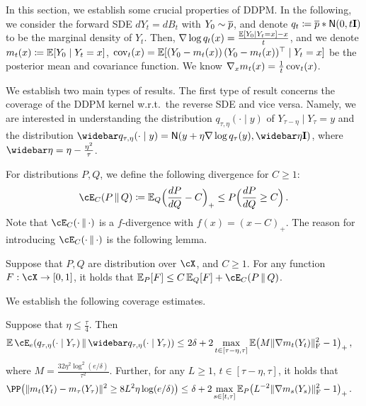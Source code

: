 In this section, we establish some crucial properties of DDPM\@.
In the following, we consider the forward SDE $dY_t=dB_t$ with $Y_0\sim \overline{p}$, and denote $q_t\deq \pbar*\normal{0,t\Id}$ to be the marginal density of $Y_t$. Then, $\nabla \log q_t(x)=\frac{\operatorname{\mathbb{E}}[Y_0\mid Y_t=x]-x}{t}$, and we denote $m_t(x)\coloneqq \operatorname{\mathbb{E}}[Y_0\mid Y_t=x]$, $\mathrm{cov}_t(x)=\operatorname{\mathbb{E}}[(Y_0-m_t(x))\,(Y_0-m_t(x))^\top\mid Y_t=x]$ be the posterior mean and covariance function. We know $\nabla_x m_t(x)=\frac{1}{t}\,\mathrm{cov}_t(x)$.

We establish two main types of results.
The first type of result concerns the coverage of the DDPM kernel w.r.t.\ the reverse SDE and vice versa.
Namely, we are interested in understanding the distribution $q_{\tau,\eta}(\cdot\mid y)$ of $Y_{\tau-\eta}\mid Y_\tau=y$ and the distribution $\wb{q}_{\tau,\eta}(\cdot\mid y)=\normal{y+\eta \nabla \log q_\tau(y), \etabar\Id}$, where $\etabar=\eta-\frac{\eta^2}{\tau}$.

For distributions $P,Q$, we define the following divergence for $C\geq 1$:
\begin{align*}
    \Dcov[C]{P}{Q}\deq \En_Q\prn[\Big]{\frac{dP}{dQ}-C}_+\leq P\prn[\Big]{\frac{dP}{dQ}\geq C}\,.
\end{align*}
Note that $\Dcov[C]{\cdot}{\cdot}$ is a $f$-divergence with $f(x)=(x-C)_+$.
The reason for introducing $\Dcov[C]{\cdot}{\cdot}$ is the following lemma. 
\begin{lemma}\label{lem:Dcov}
Suppose that $P,Q$ are distribution over $\cX$, and $C\geq 1$. For any function $F:\cX\to [0,1]$, it holds that $\En_P[F]\leq C\En_Q[F]+\Dcov[C]{P}{Q}$.
\end{lemma}

We establish the following coverage estimates.

\begin{proposition}\label{prop:DDPM-coverage}
Suppose that $\eta\leq \frac{\tau}{4}$. Then
\begin{align*}
    \En\Dcov[e]{q_{\tau,\eta}(\cdot\mid Y_\tau)}{\wb{q}_{\tau,\eta}(\cdot\mid Y_\tau)}
    \leq&~ 2\delta+2\max_{t\in[\tau-\eta, \tau]}\En\prn*{ M\nrmF{\nabla m_{t}(Y_t)}^2-1 }_+\,,
\end{align*}
where $M=\frac{32\eta^2\log^2(e/\delta)}{\tau^2}$. Further, for any $L\geq 1$, $t\in[\tau-\eta,\tau]$, it holds that
\begin{align*}
    \PP\prn*{ \nrm{m_t(Y_t)-m_\tau(Y_\tau)}^2 \geq 8L^2\eta\log(e/\delta) }
    \leq&~ \delta+2\max_{s\in[t,\tau]} \En_P \prn*{L^{-2}\nrmF{\nabla m_{s}(Y_s)}^2-1}_+\,.
\end{align*}
\end{proposition}

